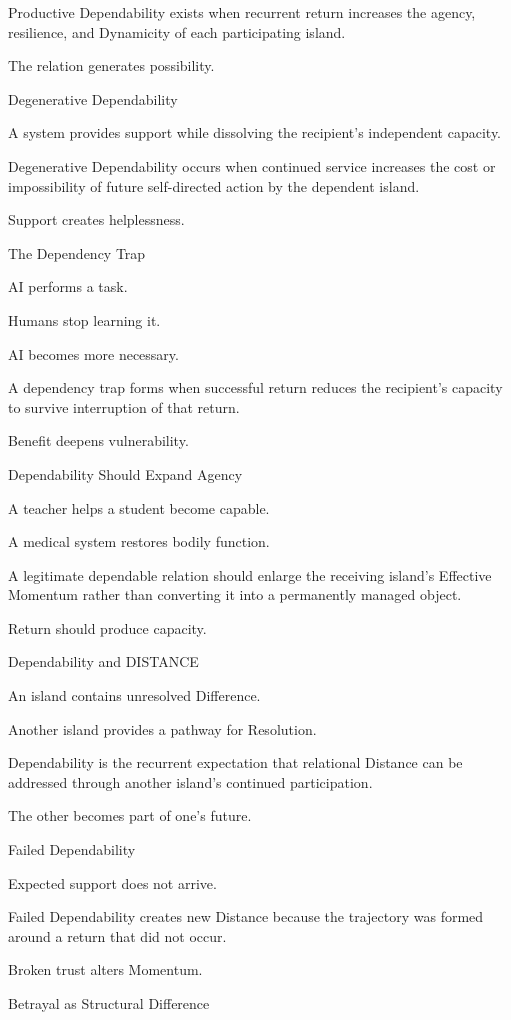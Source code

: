 Productive Dependability exists when recurrent return increases the agency, resilience, and Dynamicity of each participating island.

The relation generates possibility.

Degenerative Dependability

A system provides support while dissolving the recipient’s independent capacity.

Degenerative Dependability occurs when continued service increases the cost or impossibility of future self-directed action by the dependent island.

Support creates helplessness.

The Dependency Trap

AI performs a task.

Humans stop learning it.

AI becomes more necessary.

A dependency trap forms when successful return reduces the recipient’s capacity to survive interruption of that return.

Benefit deepens vulnerability.

Dependability Should Expand Agency

A teacher helps a student become capable.

A medical system restores bodily function.

A legitimate dependable relation should enlarge the receiving island’s Effective Momentum rather than converting it into a permanently managed object.

Return should produce capacity.

Dependability and DISTANCE

An island contains unresolved Difference.

Another island provides a pathway for Resolution.

Dependability is the recurrent expectation that relational Distance can be addressed through another island’s continued participation.

The other becomes part of one’s future.

Failed Dependability

Expected support does not arrive.

Failed Dependability creates new Distance because the trajectory was formed around a return that did not occur.

Broken trust alters Momentum.

Betrayal as Structural Difference

